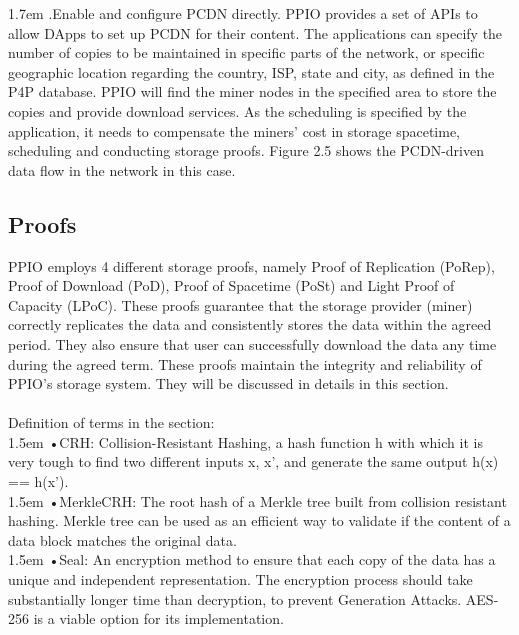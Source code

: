 \documentclass[10pt,a4paper]{article}
\begin{document}
\hangindent 1.7em
.\quad Enable and configure PCDN directly. PPIO provides a set of APIs to allow DApps to set up PCDN for their content. The applications can specify the number of copies to be maintained in specific parts of the network, or specific geographic location regarding the country, ISP, state and city, as defined in the P4P database. PPIO will find the miner nodes in the specified area to store the copies and provide download services. As the scheduling is specified by the application, it needs to compensate the miners’ cost in storage spacetime, scheduling and conducting storage proofs. Figure 2.5 shows the PCDN-driven data flow in the network in this case.
\vspace{-1em}


         \subsection{Proofs}%
PPIO employs 4 different storage proofs, namely Proof of Replication (PoRep), Proof of Download (PoD), Proof of Spacetime (PoSt) and Light Proof of Capacity (LPoC). These proofs guarantee that the storage provider (miner) correctly replicates the data and consistently stores the data within the agreed period. They also ensure that user can successfully download the data any time during the agreed term. These proofs maintain the integrity and reliability of PPIO's storage system. They will be discussed in details in this section.
\vspace{-0.5em}
\\ \\Definition of terms in the section:
\vspace{-0.8em}
\\

\hangindent 1.5em
\noindent   
•\quad CRH: Collision-Resistant Hashing, a hash function h with which it is very tough to find two different inputs x, x', and generate the same output h(x) == h(x').
\vspace{-0.8em}
\\

\hangindent 1.5em
\noindent   
•\quad MerkleCRH: The root hash of a Merkle tree built from collision resistant hashing. Merkle tree can be used as an efficient way to validate if the content of a data block matches the original data.
\vspace{-0.8em}
\\

\hangindent 1.5em
\noindent   
•\quad Seal: An encryption method to ensure that each copy of the data has a unique and independent representation. The encryption process should take substantially longer time than decryption, to prevent Generation Attacks. AES-256 is a viable option for its implementation.
\vspace{-0.8em}
\\
\end{document}
